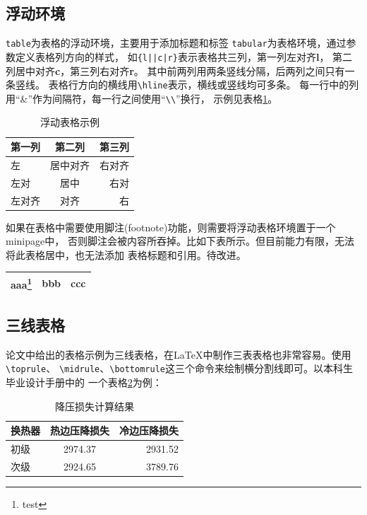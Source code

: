 \subsection{浮动环境}
\label{subsec-table-float}
\texttt{table}为表格的浮动环境，主要用于添加标题和标签
\texttt{tabular}为表格环境，通过参数定义表格列方向的样式，
如\verb+{l||c|r}+表示表格共三列，第一列左对齐{\bf l}，
第二列居中对齐{\bf c}，第三列右对齐{\bf r}。
其中前两列用两条竖线分隔，后两列之间只有一条竖线。
表格行方向的横线用\verb|\hline|表示，横线或竖线均可多条。
每一行中的列用“\&”作为间隔符，每一行之间使用“\verb|\\|”换行，
示例见表格\ref{tab-sample}。
\begin{table}
    \centering
    \caption{浮动表格示例}
    \label{tab-sample}
    \begin{tabular}{l||c|r}
        \hline
        第一列 & 第二列   & 第三列 \\ \hline \hline
        左     & 居中对齐 & 右对齐 \\ \hline
        左对   & 居中     & 右对   \\ \hline
        左对齐 & 对齐     & 右     \\ \hline
    \end{tabular}
\end{table}
如果在表格中需要使用脚注(footnote)功能，则需要将浮动表格环境置于一个minipage中，
否则脚注会被内容所吞掉。比如下表所示。但目前能力有限，无法将此表格居中，也无法添加
表格标题和引用。待改进。

\begin{minipage}[h]{\textwidth}
    \begin{tabular}{|c|c|c|}
        \hline
        aaa\footnote{test} & bbb & ccc \\
        \hline
    \end{tabular}
\end{minipage}

\subsection{三线表格}
\label{three-line-table}

论文中给出的表格示例为三线表格，在\LaTeX{}中制作三表表格也非常容易。使用\verb|\toprule|、
\verb|\midrule|、\verb|\bottomrule|这三个命令来绘制横分割线即可。以本科生毕业设计手册中的
一个表格\ref{tab-three-line-table-example}为例：

\begin{table}
    \centering
    \caption{降压损失计算结果}
    \label{tab-three-line-table-example}
    \begin{tabular}{lcr}
        \toprule
        换热器 & 热边压降损失 & 冷边压降损失 \\
        \midrule
        初级   & 2974.37      & 2931.52      \\
        次级   & 2924.65      & 3789.76      \\
        \bottomrule
    \end{tabular}
\end{table}

